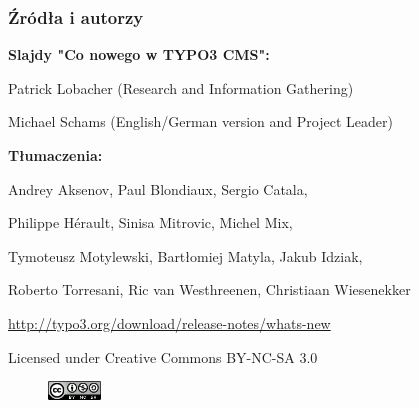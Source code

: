 \begin{frame}[fragile]
	\frametitle{Źródła i autorzy}

	\centerline{\textbf{Slajdy "Co nowego w TYPO3 CMS":}}
	\centerline{Patrick Lobacher (Research and Information Gathering)}
	\centerline{Michael Schams (English/German version and Project Leader)}

		\centerline{\textbf{Tłumaczenia:}}
		\centerline{Andrey Aksenov, Paul Blondiaux, Sergio Catala,}
		\centerline{Philippe Hérault, Sinisa Mitrovic, Michel Mix,}
		\centerline{Tymoteusz Motylewski, Bartłomiej Matyla, Jakub Idziak,}
		\centerline{Roberto Torresani, Ric van Westhreenen, Christiaan Wiesenekker}

	\smaller\begin{center}\url{http://typo3.org/download/release-notes/whats-new}\end{center}\normalsize

	\smaller\begin{center}Licensed under Creative Commons BY-NC-SA 3.0\end{center}\normalsize
	\begin{figure}\vspace*{-0.2cm}
		\includegraphics[width=1.4cm]{Images/SourcesAndAuthors/CreativeCommons-BY-NC-SA.png}
	\end{figure}

\end{frame}



